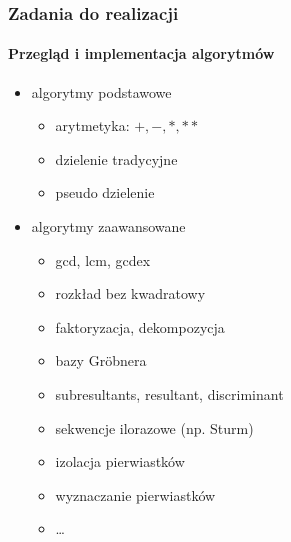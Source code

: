 \documentclass{beamer}
\begin{document}
\begin{frame}
    \frametitle{Zadania do realizacji}
    \framesubtitle{Przegląd i implementacja algorytmów}

    \begin{itemize}
        \item algorytmy podstawowe
            \begin{itemize}
                \item arytmetyka: $+, -, *, **$
                \item dzielenie tradycyjne
                \item pseudo dzielenie
            \end{itemize}
        \pause
        \item algorytmy zaawansowane
            \begin{itemize}
                \item gcd, lcm, gcdex
                \item rozkład bez kwadratowy
                \item faktoryzacja, dekompozycja
                \item bazy Gr\"{o}bnera
                \item subresultants, resultant, discriminant
                \item sekwencje ilorazowe (np. Sturm)
                \item izolacja pierwiastków
                \item wyznaczanie pierwiastków
                \item \ldots
            \end{itemize}
    \end{itemize}
\end{frame}
\end{document}
